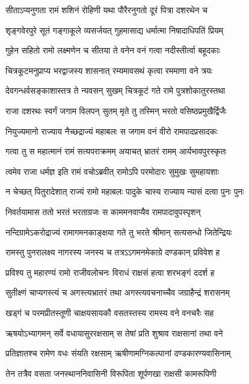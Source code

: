 \twolineshloka
{सीताऽप्यनुगता रामं शशिनं रोहिणी यथा}
{पौरैरनुगतो दूरं पित्रा दशरथेन च}%

\twolineshloka
{शृङ्गवेरपुरे सूतं गङ्गाकूले व्यसर्जयत्}
{गुहमासाद्य धर्मात्मा निषादाधिपतिं प्रियम्}%

\twolineshloka
{गुहेन सहितो रामो लक्ष्मणेन च सीतया}
{ते वनेन वनं गत्वा नदीस्तीर्त्वा बहूदकाः}%

\twolineshloka
{चित्रकूटमनुप्राप्य भरद्वाजस्य शासनात्}
{रम्यमावसथं कृत्वा रममाणा वने त्रयः}%

\twolineshloka
{देवगन्धर्वसङ्काशास्तत्र ते न्यवसन् सुखम्}
{चित्रकूटं गते रामे पुत्रशोकातुरस्तथा}%

\twolineshloka
{राजा दशरथः स्वर्गं जगाम विलपन् सुतम्}
{मृते तु तस्मिन् भरतो वसिष्ठप्रमुखैर्द्विजैः}%

\twolineshloka
{नियुज्यमानो राज्याय नैच्छद्राज्यं महाबलः}
{स जगाम वनं वीरो रामपादप्रसादकः}%

\twolineshloka
{गत्वा तु स महात्मानं रामं सत्यपराक्रमम्}
{अयाचत् भ्रातरं रामम् आर्यभावपुरस्कृतः}%

\twolineshloka
{त्वमेव राजा धर्मज्ञ इति रामं वचोऽब्रवीत्}
{रामोऽपि परमोदारः सुमुखः सुमहायशाः}%

\twolineshloka
{न चेच्छत् पितुरादेशात् राज्यं रामो महाबलः}
{पादुके चास्य राज्याय न्यासं दत्वा पुनः पुनः}%

\twolineshloka
{निवर्तयामास ततो भरतं भरताग्रजः}
{स काममनवाप्यैव रामपादावुपस्पृशन्}%

\twolineshloka
{नन्दिग्रामेऽकरोद्राज्यं रामागमनकाङ्क्षया}
{गते तु भरते श्रीमान् सत्यसन्धो जितेन्द्रियः}%

\twolineshloka
{रामस्तु पुनरालक्ष्य नागरस्य जनस्य च}
{तत्रऽऽगमनमेकाग्रे दण्डकान् प्रविवेश ह}%

\twolineshloka
{प्रविश्य तु महारण्यं रामो राजीवलोचनः}
{विराधं राक्षसं हत्वा शरभङ्गं ददर्श ह}%

\twolineshloka
{सुतीक्ष्णं चाप्यगस्त्यं च अगस्त्यभ्रातरं तथा}
{अगस्त्यवचनाच्चैव जग्राहैन्द्रं शरासनम्}%

\twolineshloka
{खड्गं च परमप्रीतस्तूणी चाक्षयसायकौ}
{वसतस्तस्य रामस्य वने वनचरैः सह}%

\twolineshloka
{ऋषयोऽभ्यागमन् सर्वे वधायासुररक्षसाम्}
{स तेषां प्रति शुश्राव राक्षसानां तथा वने}%

\twolineshloka
{प्रतिज्ञातश्च रामेण वधः संयति रक्षसाम्}
{ऋषीणामग्निकल्पानां दण्डकारण्यवासिनाम्}%

\twolineshloka
{तेन तत्रैव वसता जनस्थाननिवासिनी}
{विरूपिता शूर्पणखा राक्षसी कामरूपिणी}%

